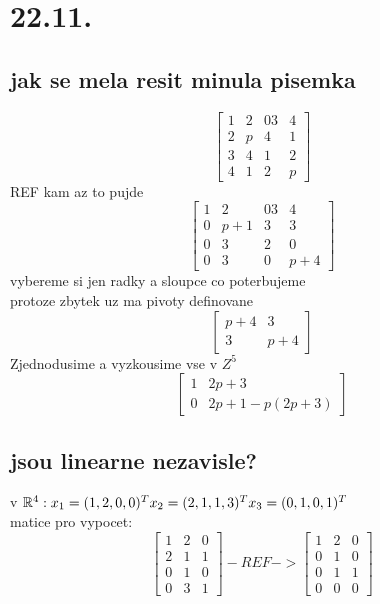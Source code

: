 \documentclass[a4paper]{article}
\begin{document}
\section{22.11.}
\subsection{jak se mela resit minula pisemka}
$$
\begin{bmatrix}
	1 & 2 & 03 & 4 \\
	2 & p & 4  & 1  \\
	3 & 4 & 1 &2   \\
	4 &1 &2 & p 
\end{bmatrix}
$$
REF kam az to pujde
$$
\begin{bmatrix}
	1 & 2 & 03 & 4 \\
	0 & p+1 & 3  & 3  \\
	0 & 3 & 2 &0   \\
	0 &3 &0 & p+4 
\end{bmatrix}
$$
vybereme si jen radky a sloupce co poterbujeme\\
protoze zbytek uz ma pivoty definovane
$$
\begin{bmatrix}
	p+4 & 3 \\
	3 & p+4
\end{bmatrix}
$$
Zjednodusime a vyzkousime vse v $Z^5$
$$
\begin{bmatrix}
	1 & 2p+3 \\
	0 & 2p+1-p(2p+3)
\end{bmatrix}
$$
\subsection{jsou linearne nezavisle?}
v $\mathbb{R}^4: \\
x_1=(1,2,0,0)^T \\
x_2=(2,1,1,3)^T \\
x_3=(0,1,0,1)^T
$
\\
matice pro vypocet:
$$
\begin{bmatrix}
	1 & 2 & 0 \\
	2 & 1 & 1 \\
	0 & 1 & 0 \\
	0 & 3 & 1 
\end{bmatrix}
-REF->
\begin{bmatrix}
	1 & 2 & 0 \\
	0 & 1 & 0 \\
	0 & 1 & 1 \\
	0 & 0 & 0 
\end{bmatrix}
$$
\end{document}
